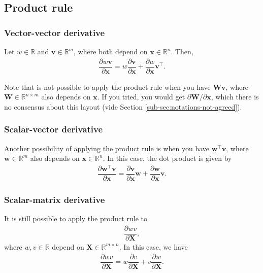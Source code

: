 \documentclass{article}
\newcommand{\trans}{\top}
\begin{document}
\subsection{Product rule}
\subsubsection{Vector-vector derivative}
Let \(w \in \mathbb{R}\) and \(\mathbf{v} \in \mathbb{R}^{m}\), where both depend on \(\mathbf{x} \in \mathbb{R}^{n}\). Then,
\begin{align}
    \dfrac{\partial w \mathbf{v}}{\partial \mathbf{x}} = w \dfrac{\partial \mathbf{v}}{\partial \mathbf{x}} + \dfrac{\partial w}{\partial \mathbf{x}} \mathbf{v}^\trans.
\end{align}

Note that is not possible to apply the product rule when you have \(\mathbf{Wv}\), where \(\mathbf{W} \in \mathbb{R}^{n \times m}\) also depends on \(\mathbf{x}\). If you tried, you would get \(\partial\mathbf{W}/\partial\mathbf{x}\), which there is no consensus about this layout (vide Section \ref{sub-sec:notations-not-agreed}).
\subsubsection{Scalar-vector derivative}
Another possibility of applying the product rule is when you have \(\mathbf{w}^{\trans} \mathbf{v}\), where \(\mathbf{w} \in \mathbb{R}^{m}\) also depends on \(\mathbf{x} \in \mathbb{R}^{n}\). In this case, the dot product is given by
\begin{align}
    \label{eq:scalar-vector-product-rule}
    \dfrac{\partial \mathbf{w}^{\trans} \mathbf{v}}{\partial \mathbf{x}} = \dfrac{\partial \mathbf{v}}{\partial \mathbf{x}} \mathbf{w} + \dfrac{\partial \mathbf{w}}{\partial \mathbf{x}} \mathbf{v}.
\end{align}

\subsubsection{Scalar-matrix derivative}
It is still possible to apply the product rule to
\begin{align}
    \dfrac{\partial wv}{\partial \mathbf{X}},
\end{align}
where \(w,v \in \mathbb{R}\) depend on \(\mathbf{X} \in \mathbb{R}^{m \times n}\). In this case, we have
\begin{align}
    \dfrac{\partial wv}{\partial \mathbf{X}} = w \dfrac{\partial v}{\partial \mathbf{X}} + v \dfrac{\partial w}{\partial \mathbf{X}}.
\end{align}
\end{document}
